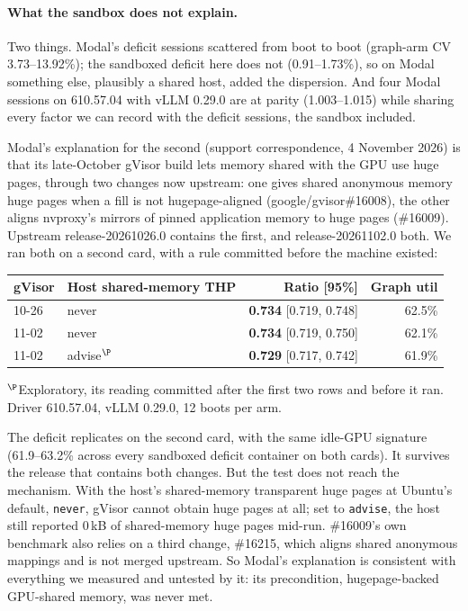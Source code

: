 \documentclass[11pt]{article}
\newcommand{\tw}[1]{\texttt{\small #1}}
\begin{document}
\paragraph{What the sandbox does not explain.} Two things. Modal's deficit
sessions scattered from boot to boot (graph-arm CV 3.73--13.92\%); the
sandboxed deficit here does not (0.91--1.73\%), so on Modal something else,
plausibly a shared host, added the dispersion. And four Modal sessions on
610.57.04 with vLLM 0.29.0 are at parity (1.003--1.015) while sharing every
factor we can record with the deficit sessions, the sandbox included.

Modal's explanation for the second (support correspondence, 4 November
2026) is that its late-October gVisor build lets memory shared with the GPU
use huge pages, through two changes now upstream: one gives shared
anonymous memory huge pages when a fill is not hugepage-aligned
(google/gvisor\#16008), the other aligns nvproxy's mirrors of pinned
application memory to huge pages (\#16009). Upstream release-20261026.0
contains the first, and release-20261102.0 both. We ran both on a second
card, with a rule committed before the machine existed:

\begin{center}\small
\begin{tabular}{llrr}
\toprule
gVisor & Host shared-memory THP & Ratio [95\%] & Graph util\\
\midrule
10-26 & never & \textbf{0.734} [0.719, 0.748] & 62.5\%\\
11-02 & never & \textbf{0.734} [0.719, 0.750] & 62.1\%\\
11-02 & advise$^\P$ & \textbf{0.729} [0.717, 0.742] & 61.9\%\\
\bottomrule
\end{tabular}
\end{center}

\noindent
$^\P$Exploratory, its reading committed after the first two rows and
before it ran. Driver 610.57.04, vLLM 0.29.0, 12 boots per arm.

The deficit replicates on the second card, with the same idle-GPU signature
(61.9--63.2\% across every sandboxed deficit container on both cards). It
survives the release that contains both changes. But the test does not reach
the mechanism. With the host's shared-memory transparent huge pages at
Ubuntu's default, \tw{never}, gVisor cannot obtain huge pages at all; set to
\tw{advise}, the host still reported 0\,kB of shared-memory huge pages mid-run.
\#16009's own benchmark also relies on a third change, \#16215, which aligns
shared anonymous mappings and is not merged upstream. So Modal's explanation
is consistent with everything we measured and untested by it: its
precondition, hugepage-backed GPU-shared memory, was never met.
\end{document}
